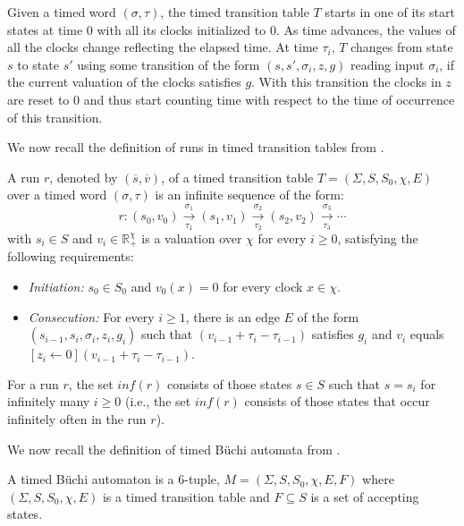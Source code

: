 Given a timed word $(\sigma, \tau)$, the timed transition table $T$ starts in one of its start states at time $0$ with all its clocks initialized to $0$. As time advances, the values of all the clocks change reflecting the elapsed time. At time $\tau_{i}$, $T$ changes from state $s$ to state $s'$ using some transition of the form $(s, s', \sigma_{i}, z, g)$ reading input $\sigma_{i}$, if the current valuation of the clocks satisfies $g$. With this transition the clocks in $z$ are reset to $0$ and thus start counting time with respect to the time of occurrence of this transition.

We now recall the definition of runs in timed transition tables from \cite{1}.

\begin{definition}
A run $r$, denoted by $(\overline{s}, \overline{v})$, of a timed transition table $T = (\Sigma, S, S_{0}, \chi, E)$ over a timed word $(\sigma, \tau)$ is an infinite sequence of the form:
\[r: (s_{0}, v_{0}) \overset{\sigma_{1}}{\underset{\tau_{1}}{\longrightarrow}} (s_{1}, v_{1}) \overset{\sigma_{2}}{\underset{\tau_{2}}{\longrightarrow}} (s_{2}, v_{2}) \overset{\sigma_{3}}{\underset{\tau_{3}}{\longrightarrow}} \cdots \]
with $s_{i} \in S$ and $v_{i} \in \mathbb{R}_{+}^{\chi}$ is a valuation over $\chi$ for every $i \geq 0$, satisfying the following requirements:
\begin{itemize}
\item \textit{Initiation:} $s_{0} \in S_{0}$ and $v_{0}(x) = 0$ for every clock $x \in \chi$.
\item \textit{Consecution:} For every $i \geq 1$, there is an edge $E$ of the form $(s_{i-1}, s_{i}, \sigma_{i}, z_{i}, g_{i})$ such that $(v_{i-1} + \tau_{i} - \tau_{i-1})$ satisfies $g_{i}$ and $v_{i}$ equals $[z_{i} \leftarrow 0](v_{i-1} + \tau_{i} - \tau_{i-1})$.
\end{itemize}
\end{definition}

For a run $r$, the set $inf(r)$ consists of those states $s \in S$ such that $s = s_{i}$ for infinitely many $i \geq 0$ (i.e., the set $inf(r)$ consists of those states that occur infinitely often in the run $r$).

We now recall the definition of timed B{\"u}chi automata from \cite{1}.

\begin{definition}
A timed B{\"u}chi automaton is a 6-tuple, $M = (\Sigma, S, S_{0}, \chi, E, F)$ where $(\Sigma, S, S_{0}, \chi, E)$ is a timed transition table and $F \subseteq S$ is a set of accepting states.
\end{definition}

